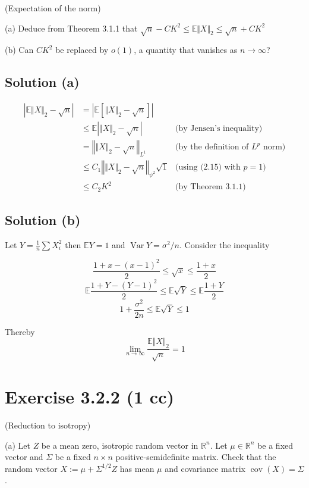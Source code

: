 \documentclass{article}
\DeclareMathOperator{\Var}{Var}
\DeclareMathOperator{\cov}{cov}
\begin{document}
(Expectation of the norm)

(a) Deduce from Theorem 3.1.1 that $\sqrt{n} - CK^2 \leq \mathbb E \Vert X \Vert_2 \leq \sqrt{n} + CK^2$

(b) Can $CK^2$ be replaced by $o(1)$, a quantity that vanishes as $n \to \infty$?

\subsection{Solution (a)}

\begin{equation*}
    \begin{aligned}
        |\mathbb E \Vert X \Vert_2 - \sqrt{n}| & = \left\vert \mathbb E \left[\Vert X \Vert_2 -\sqrt{n}\right] \right\vert \\
        & \leq \mathbb E \left\vert \Vert X \Vert_2 - \sqrt{n} \right\vert & \text{(by Jensen's inequality)} \\
        & = \left\Vert \Vert X \Vert_2 - \sqrt{n} \right\Vert_{L^1} & \text{(by the definition of $L^p$ norm)} \\
        & \leq C_1 \left\Vert \Vert X \Vert_2 - \sqrt{n} \right\Vert_{\psi^2}\sqrt{1} & \text{(using (2.15) with $p=1$)} \\
        & \leq C_2K^2 & \text{(by Theorem 3.1.1)}
    \end{aligned}
\end{equation*}

\subsection{Solution (b)}

Let $Y = \frac{1}{n}\sum X_i^2$ then $\mathbb E Y = 1$ and $\Var Y = \sigma^2/n$. Consider the inequality

$$\frac{1+x-(x-1)^2}{2} \leq \sqrt{x} \leq \frac{1+x}{2}$$
$$\mathbb E \frac{1+Y-(Y-1)^2}{2} \leq \mathbb E\sqrt{Y} \leq \mathbb E \frac{1+Y}{2}$$
$$1 + \frac{\sigma^2}{2n} \leq \mathbb E\sqrt{Y} \leq 1$$

Thereby 
$$\lim_{n\to\infty} \frac{\mathbb E \Vert X \Vert_2}{\sqrt{n}} = 1$$

\section{Exercise 3.2.2 (1 cc)}

(Reduction to isotropy)

(a) Let $Z$ be a mean zero, isotropic random vector in $\mathbb R^n$. Let $\mu \in \mathbb R^n$ be a fixed vector and $\Sigma$ be a fixed $n \times n$ positive-semidefinite matrix. Check that the random vector $X := \mu + \Sigma^{1/2}Z$ has mean $\mu$ and covariance matrix $\cov(X) = \Sigma$.
\end{document}
